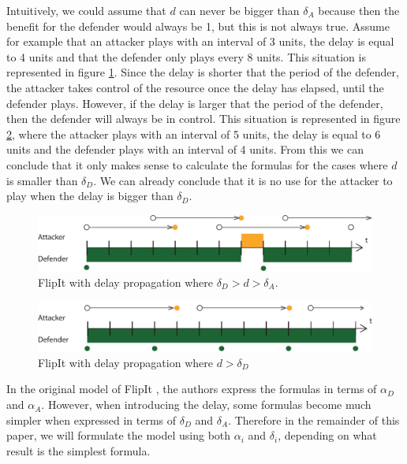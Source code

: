 Intuitively, we could assume that $d$ can never be bigger than $\delta_{A}$ because then the benefit for the defender would always be 1, but this is not always true. Assume for example that an attacker plays with an interval of 3 units, the delay is equal to 4 units and that the defender only plays every 8 units. This situation is represented in figure \ref{langedelay}. Since the delay is shorter that the period of the defender, the attacker takes control of the resource once the delay has elapsed, until the defender plays. However, if the delay is larger that the period of the defender, then the defender will always be in control. This situation is represented in figure \ref{langeredelay}, where the attacker plays with an interval of 5 units, the delay is equal to 6 units and the defender plays with an interval of 4 units. From this we can conclude that it only makes sense to calculate the formulas for the cases where $d$ is smaller than $\delta_{D}$. We can already conclude that it is no use for the attacker to play when the delay is bigger than $\delta_{D}$. 




\begin{figure}[hbtp]
\centering
\includegraphics[scale=0.7]{Images/FlipItCase1delay.pdf} 
\caption{FlipIt with delay propagation where $\delta_{D} > d > \delta_{A}$.   }
\label{langedelay}
\end{figure}

\begin{figure}[hbtp]
\centering
\includegraphics[scale=0.7]{Images/FlipItCase1delaytobig.pdf} 
\caption{FlipIt with delay propagation where $ d > \delta_{D}$ }
\label{langeredelay}
\end{figure}


In the original model of FlipIt \cite{FlipIt}, the authors express the formulas in terms of $\alpha_{D}$ and $\alpha_{A}$. However, when introducing the delay, some formulas become much simpler when expressed in terms of $\delta_{D}$ and $\delta_{A}$. Therefore in the remainder of this paper, we will formulate the model using both $\alpha_{i}$ and $\delta_{i}$, depending on what result is the simplest formula.

